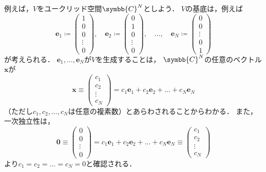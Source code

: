 \documentclass[
]{sotsu}
\begin{document}
\quad 
例えば，$V$をユークリッド空間$\symbb{C}^N$としよう．
$V$の基底は，例えば
\begin{equation}
    \label{eq:Euclidean-basis-1}
    \symbf{e}_1 \coloneq
    \begin{pmatrix}
        1  \\  0  \\  0  \\  \vdots  \\  0
    \end{pmatrix}
    , \quad
    \symbf{e}_2 \coloneq
    \begin{pmatrix}
        0  \\  1  \\  0  \\  \vdots  \\  0
    \end{pmatrix}
    , \quad \dotsc, \quad
    \symbf{e}_N \coloneq
    \begin{pmatrix}
        0  \\  0  \\  \vdots  \\  0  \\  1
    \end{pmatrix}
\end{equation}
が考えられる．
$\symbf{e}_1, \dots, \symbf{e}_N$が$V$を生成することは，
$\symbb{C}^N$の任意のベクトル$\symbf{x}$が
\begin{equation*}
    \symbf{x}
    \equiv
    \begin{pmatrix}
        c_1  \\  c_2  \\  \vdots  \\  c_N
    \end{pmatrix}
    =
    c_1 \symbf{e}_1 + c_2 \symbf{e}_2 + \dots + c_N \symbf{e}_N
\end{equation*}
（ただし$c_1, c_2, \dots, c_N$は任意の複素数）とあらわされることからわかる．
また，一次独立性は，
\begin{equation*}
    \symbf{0} 
        \equiv
        \begin{pmatrix}
            0  \\  0  \\  \vdots  \\  0
        \end{pmatrix}
        = c_1 \symbf{e}_1 + c_2 \symbf{e}_2 + \dots + c_N \symbf{e}_N
        \equiv
        \begin{pmatrix}
            c_1  \\  c_2  \\  \vdots  \\  c_N
        \end{pmatrix}
\end{equation*}
より$c_1 = c_2 = \dots = c_N = 0$と確認される．
\end{document}
